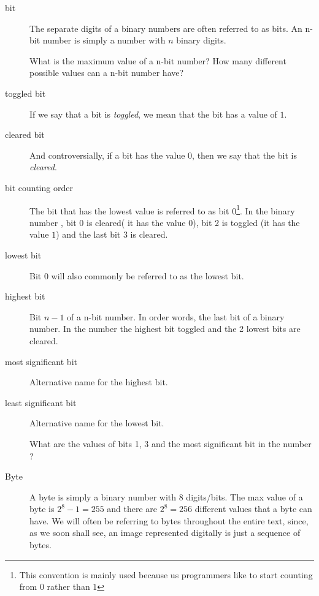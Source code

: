 \begin{description}
\begin{Exercise}[label={bin-to-n}]
  \end{Exercise}

\item[bit] The separate digits of a binary numbers are often referred
  to as bits. An n-bit number is simply a number with $n$ binary digits.

  \begin{Exercise}[label={n-bits-max-val}]
    What is the maximum value of a n-bit number?  How many different
    possible values can a n-bit number have?
  \end{Exercise}

\item[toggled bit] If we say that a bit is \textit{toggled}, we mean that
  the bit has a value of $1$.

\item[cleared bit] And controversially, if a bit has the value
  $0$, then we say that the bit is \textit{cleared}.

\item[bit counting order] The bit that has the lowest value is
  referred to as bit 0\footnote{This convention is mainly used because
    us programmers like to start counting from $0$ rather than $1$}.
  In the binary number , bit 0 is cleared( it has the value
  $0$), bit 2 is toggled (it has the value $1$) and the last bit 3 is
  cleared.

\item[lowest bit] Bit 0 will also commonly be referred to as the
  lowest bit.

\item[highest bit] Bit $n-1$ of a n-bit number. In order words, the
  last bit of a binary number. In the number  the highest bit
  toggled and the 2 lowest bits are cleared.

\item[most significant bit] Alternative name for the highest bit.

\item[least significant bit] Alternative name for the lowest bit.

  \begin{Exercise}[label={bits-value-order}]
    What are the values of bits 1, 3 and the most significant bit in the
    number ?

  \end{Exercise}

\item[Byte] A byte is simply a binary number with 8 digits/bits. The
  max value of a byte is $2^8 - 1 = 255$ and there are $2^8 = 256$
  different values that a byte can have. We will often be referring to
  bytes throughout the entire text, since, as we soon shall see, an
  image represented digitally is just a sequence of bytes.


\end{description}
